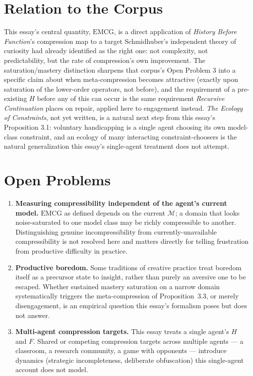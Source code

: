 \documentclass[11pt]{article}
\begin{document}
\section{Relation to the Corpus}

This essay's central quantity, $\mathrm{EMCG}$, is a direct application of \emph{History Before Function}'s compression map to a target Schmidhuber's independent theory of curiosity had already identified as the right one: not complexity, not predictability, but the rate of compression's own improvement. The saturation/mastery distinction sharpens that corpus's Open Problem 3 into a specific claim about when meta-compression becomes attractive (exactly upon saturation of the lower-order operators, not before), and the requirement of a pre-existing $H$ before any of this can occur is the same requirement \emph{Recursive Continuation} places on repair, applied here to engagement instead. \emph{The Ecology of Constraints}, not yet written, is a natural next step from this essay's Proposition 3.1: voluntary handicapping is a single agent choosing its own model-class constraint, and an ecology of many interacting constraint-choosers is the natural generalization this essay's single-agent treatment does not attempt.

\section*{Open Problems}

\begin{enumerate}
\item \textbf{Measuring compressibility independent of the agent's current model.} $\mathrm{EMCG}$ as defined depends on the current $\mathcal{M}$; a domain that looks noise-saturated to one model class may be richly compressible to another. Distinguishing genuine incompressibility from currently-unavailable compressibility is not resolved here and matters directly for telling frustration from productive difficulty in practice.
\item \textbf{Productive boredom.} Some traditions of creative practice treat boredom itself as a precursor state to insight, rather than purely an aversive one to be escaped. Whether sustained mastery saturation on a narrow domain systematically triggers the meta-compression of Proposition~3.3, or merely disengagement, is an empirical question this essay's formalism poses but does not answer.
\item \textbf{Multi-agent compression targets.} This essay treats a single agent's $H$ and $F$. Shared or competing compression targets across multiple agents — a classroom, a research community, a game with opponents — introduce dynamics (strategic incompleteness, deliberate obfuscation) this single-agent account does not model.
\end{enumerate}
\end{document}
